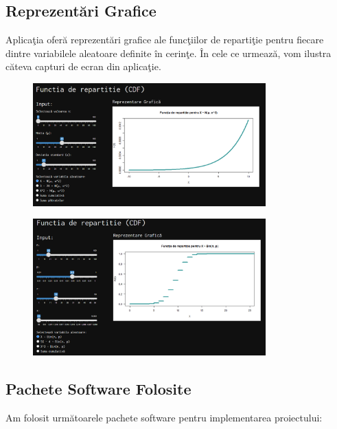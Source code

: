 \documentclass[a4paper,11pt]{article}
\begin{document}
\newpage

\subsection*{Reprezent\u{a}ri Grafice}

Aplica\c{t}ia ofer\u{a} reprezent\u{a}ri grafice ale func\c{t}iilor de reparti\c{t}ie pentru fiecare dintre variabilele aleatoare definite în cerin\c{t}e. În cele ce urmeaz\u{a}, vom ilustra c\u{a}teva capturi de ecran din aplica\c{t}ie.

\begin{figure}[h!]
  \centering
  \includegraphics[width=0.8\textwidth]{./img/4.png}
  \label{fig:imaginea_ta_3}
\end{figure}

\begin{figure}[h!]
  \centering
  \includegraphics[width=0.8\textwidth]{./img/5.png}
  \label{fig:imaginea_ta_3}
\end{figure}

\subsection*{Pachete Software Folosite}

Am folosit urm\u{a}toarele pachete software pentru implementarea proiectului:
\end{document}
